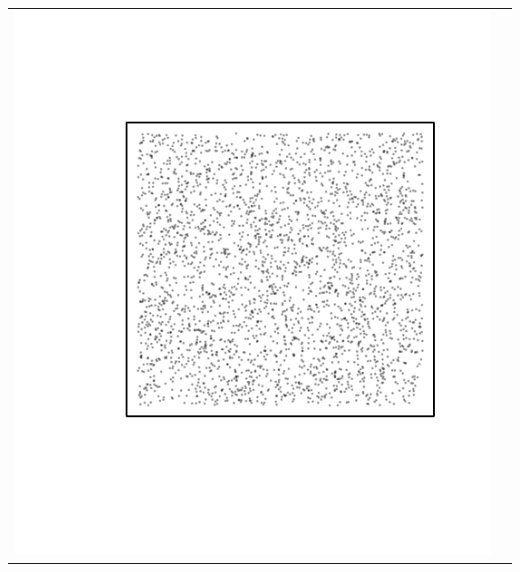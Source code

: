 \documentclass{article}\usepackage{graphicx, color}
\makeatletter
\def\maxwidth{ %
  \ifdim\Gin@nat@width>\linewidth
    \linewidth
  \else
    \Gin@nat@width
  \fi
}
\newenvironment{knitrout}{}{} %
\makeatother
\begin{document}
\vspace*{-1in}
\begin{tabular}{cc}
\begin{knitrout}
\definecolor{shadecolor}{rgb}{0.969, 0.969, 0.969}\color{fgcolor}\includegraphics[width=\maxwidth]{figure/unnamed-chunk-17} 
\end{knitrout}


\end{tabular}
\end{document}
